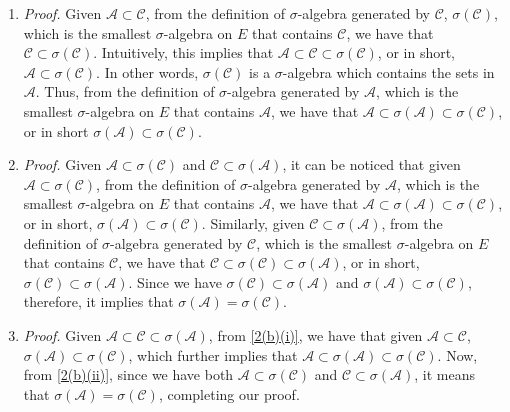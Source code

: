 \documentclass[a4paper,10pt]{article}
\begin{document}
\begin{enumerate}
\begin{enumerate}[(a)]
	\begin{enumerate}[1.]
		\item \label{2(b)(i)} \textit{Proof.} Given $\mathcal{A} \subset \mathcal{C}$, from the definition of $\sigma$-algebra generated by $\mathcal{C}$, $\sigma(\mathcal{C})$, which is the smallest $\sigma$-algebra on $E$ that contains $\mathcal{C}$, we have that $\mathcal{C} \subset \sigma(\mathcal{C})$. Intuitively, this implies that $\mathcal{A} \subset \mathcal{C} \subset \sigma(\mathcal{C})$, or in short, $\mathcal{A} \subset \sigma(\mathcal{C})$.
		In other words, $\sigma(\mathcal{C})$ is a $\sigma$-algebra which contains the sets in $\mathcal{A}$.
		Thus, from the definition of $\sigma$-algebra generated by $\mathcal{A}$, which is the smallest $\sigma$-algebra on $E$ that contains $\mathcal{A}$, we have that $\mathcal{A} \subset \sigma(\mathcal{A}) \subset \sigma(\mathcal{C})$, or in short $\sigma(\mathcal{A}) \subset \sigma(\mathcal{C})$. \qedsymbol
		\item \label{2(b)(ii)} \textit{Proof.} Given $\mathcal{A} \subset \sigma(\mathcal{C})$ and $\mathcal{C} \subset \sigma(\mathcal{A})$, it can be noticed that given $\mathcal{A} \subset \sigma(\mathcal{C})$, from the definition of $\sigma$-algebra generated by $\mathcal{A}$, which is the smallest $\sigma$-algebra on $E$ that contains $\mathcal{A}$, we have that $\mathcal{A} \subset \sigma(\mathcal{A}) \subset \sigma(\mathcal{C})$, or in short, $\sigma(\mathcal{A}) \subset \sigma(\mathcal{C})$.
		Similarly, given $\mathcal{C} \subset \sigma(\mathcal{A})$, from the definition of $\sigma$-algebra generated by $\mathcal{C}$, which is the smallest $\sigma$-algebra on $E$ that contains $\mathcal{C}$, we have that $\mathcal{C} \subset \sigma(\mathcal{C}) \subset \sigma(\mathcal{A})$, or in short, $\sigma(\mathcal{C}) \subset \sigma(\mathcal{A})$.
		Since we have $\sigma(\mathcal{C}) \subset \sigma(\mathcal{A})$ and $\sigma(\mathcal{A}) \subset \sigma(\mathcal{C})$, therefore, it implies that $\sigma(\mathcal{A}) = \sigma(\mathcal{C})$. \qedsymbol
		\item \label{2(b)(iii)} \textit{Proof.} Given $\mathcal{A} \subset \mathcal{C} \subset \sigma(\mathcal{A})$, from \ref{2(b)(i)}, we have that given $\mathcal{A} \subset \mathcal{C}$, $\sigma(\mathcal{A}) \subset \sigma(\mathcal{C})$, which further implies that $\mathcal{A} \subset \sigma(\mathcal{A}) \subset \sigma(\mathcal{C})$. Now, from \ref{2(b)(ii)}, since we have both $\mathcal{A} \subset \sigma(\mathcal{C})$ and $\mathcal{C} \subset \sigma(\mathcal{A})$, it means that $\sigma(\mathcal{A}) = \sigma(\mathcal{C})$, completing our proof. \qedsymbol

\end{enumerate}
\end{enumerate}
\end{enumerate}
\end{document}
